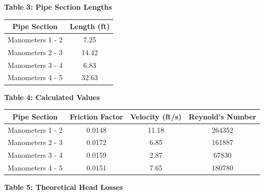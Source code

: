 \documentclass{article}
\begin{document}
\begin{center}
    \vspace{10mm}
    {\large{\bf Table 3: Pipe Section Lengths\\}}
    \vspace{3mm}

    \begin{tabular}{|cc|} 
        \hline
        \textbf{Pipe Section} & \textbf{Length (ft)}  \\ 
        \hline
        Manometers 1 - 2      & 7.25                  \\
        Manometers 2 - 3      & 14.42                 \\
        Manometers 3 - 4      & 6.83                  \\
        Manometers 4 - 5      & 32.63                 \\
        \hline
    \end{tabular}

    \vspace{10mm}
    {\large{\bf Table 4: Calculated Values\\}}
    \vspace{3mm}

    \begin{tabular}{|cccc|} 
        \hline
        \textbf{Pipe Section} & \textbf{Friction Factor} & \textbf{Velocity (ft/s)} & \textbf{Reynold's Number}  \\ 
        \hline
        Manometers 1 - 2      & 0.0148                   & 11.18                    & 264352                     \\
        Manometers 2 - 3      & 0.0172                   & 6.85                     & 161887                     \\
        Manometers 3 - 4      & 0.0159                   & 2.87                     & 67830                      \\
        Manometers 4 - 5      & 0.0151                   & 7.65                     & 180780                     \\
        \hline
    \end{tabular}

    \newpage

    {\large{\bf Table 5: Theoretical Head Losses\\}}
    \vspace{3mm}


\end{center}
\end{document}
